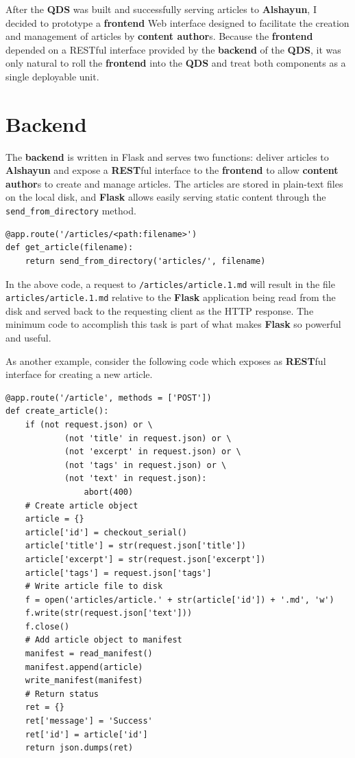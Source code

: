 \documentclass[12pt]{report}
\begin{document}
After the \textbf{QDS} was built and successfully serving articles to
\textbf{Alshayun}, I decided to prototype a \textbf{frontend} Web interface
designed to facilitate the creation and management of articles by
\textbf{content author}s. Because the \textbf{frontend} depended on a RESTful
interface provided by the \textbf{backend} of the \textbf{QDS}, it was only
natural to roll the \textbf{frontend} into the \textbf{QDS} and treat both
components as a single deployable unit.

    \section{Backend}

The \textbf{backend} is written in Flask and serves two functions: deliver
articles to \textbf{Alshayun} and expose a \textbf{REST}ful interface to the
\textbf{frontend} to allow \textbf{content author}s to create and manage
articles. The articles are stored in plain-text files on the local disk, and
\textbf{Flask} allows easily serving static content through the
\texttt{send\_from\_directory} method.

\begin{verbatim}
@app.route('/articles/<path:filename>')
def get_article(filename):
    return send_from_directory('articles/', filename)
\end{verbatim}

In the above code, a request to \texttt{/articles/article.1.md} will result in
the file \texttt{articles/article.1.md} relative to the \textbf{Flask}
application being read from the disk and served back to the requesting client as
the HTTP response. The minimum code to accomplish this task is part of what
makes \textbf{Flask} so powerful and useful.

As another example, consider the following code which exposes as
\textbf{REST}ful interface for creating a new article.

\begin{verbatim}
@app.route('/article', methods = ['POST'])
def create_article():
    if (not request.json) or \
            (not 'title' in request.json) or \
            (not 'excerpt' in request.json) or \
            (not 'tags' in request.json) or \
            (not 'text' in request.json):
                abort(400)
    # Create article object
    article = {}
    article['id'] = checkout_serial()
    article['title'] = str(request.json['title'])
    article['excerpt'] = str(request.json['excerpt'])
    article['tags'] = request.json['tags']
    # Write article file to disk
    f = open('articles/article.' + str(article['id']) + '.md', 'w')
    f.write(str(request.json['text']))
    f.close()
    # Add article object to manifest
    manifest = read_manifest()
    manifest.append(article)
    write_manifest(manifest)
    # Return status
    ret = {}
    ret['message'] = 'Success'
    ret['id'] = article['id']
    return json.dumps(ret)
\end{verbatim}
\end{document}
